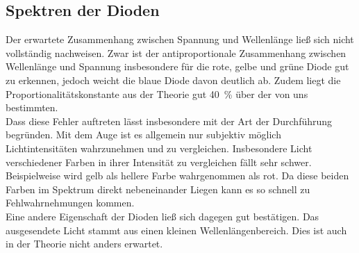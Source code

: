 \subsection{Spektren der Dioden}
Der erwartete Zusammenhang zwischen Spannung und Wellenlänge ließ sich nicht vollständig nachweisen. Zwar ist der antiproportionale Zusammenhang zwischen Wellenlänge und Spannung insbesondere für die rote, gelbe und grüne Diode gut zu erkennen, jedoch weicht die blaue Diode davon deutlich ab. Zudem liegt die Proportionalitätskonstante aus der Theorie gut \SI{40}{\percent} über der von uns bestimmten. \\
Dass diese Fehler auftreten lässt insbesondere mit der Art der Durchführung begründen. Mit dem Auge ist es allgemein nur subjektiv möglich Lichtintensitäten wahrzunehmen und zu vergleichen. Insbesondere Licht verschiedener Farben in ihrer Intensität zu vergleichen fällt sehr schwer. Beispielweise wird gelb als hellere Farbe wahrgenommen als rot. Da diese beiden Farben im Spektrum direkt nebeneinander Liegen kann es so schnell zu Fehlwahrnehmungen kommen. \\
Eine andere Eigenschaft der Dioden ließ sich dagegen gut bestätigen. Das ausgesendete Licht stammt aus einen kleinen Wellenlängenbereich. Dies ist auch in der Theorie nicht anders erwartet.